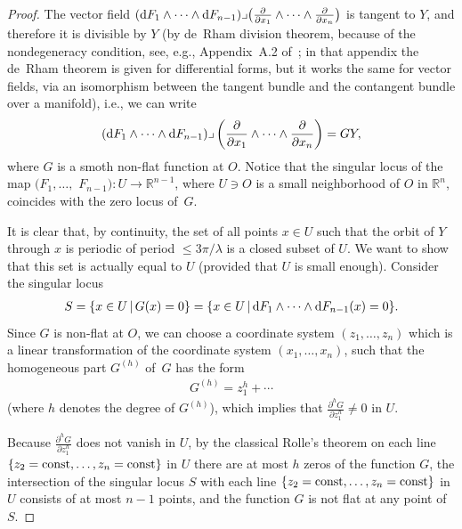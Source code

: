 \documentclass[11pt]{article}
\numberwithin{equation}{section}
\newcommand{\bbR}{\mathbb R}
\begin{document}
\begin{proof}
 The vector f\/ield $({\rm d}F_1 \wedge \dots \wedge {\rm d}F_{n-1})
\lrcorner \big(\frac{\partial}{\partial x_1} \wedge \dots \wedge \frac{\partial}{\partial x_n}\big)$
is tangent to $Y$, and therefore it is divisible by $Y$ (by de~Rham division theorem,
because of the nondegeneracy condition, see, e.g., Appendix~A.2 of~\cite{DufourZung-Poisson2005}; in that appendix the de~Rham theorem is given
for dif\/ferential forms, but it works the same for vector f\/ields, via an isomorphism between the tangent bundle and the contangent bundle over
a manifold), i.e., we can write
\begin{gather} \label{eqn:3-3}
 ({\rm d}F_1 \wedge \dots \wedge {\rm d}F_{n-1})
\lrcorner \left(\frac{\partial}{\partial x_1} \wedge \dots \wedge \frac{\partial}{\partial x_n}\right) = GY,
\end{gather}
where $G$ is a smoth non-f\/lat function at $O$. Notice that the singular locus of the map $(F_1,\dots,$ $F_{n-1})\colon U \to \bbR^{n-1}$,
where $U \ni O$ is a small neighborhood of $O$ in $\bbR^n$, coincides with the zero locus of~$G$.

It is clear that, by continuity, the set of all points $x \in U$ such that the orbit of $Y$ through $x$ is periodic of period $\leq 3\pi/\lambda$
is a closed subset of $U$. We want to show that this set is actually equal to $U$ (provided that $U$ is small enough).
Consider the singular locus
\begin{gather*}
 S = \{x \in U \, | \,G(x) = 0 \} = \{x \in U \, | \,{\rm d}F_1 \wedge \dots \wedge {\rm d}F_{n-1} (x) = 0 \}.
\end{gather*}
Since $G$ is non-f\/lat at $O$, we can choose a coordinate system $(z_1,\dots, z_n)$ which is a linear transformation of the
coordinate system $(x_1,\dots,x_n)$, such that the homogeneous part $G^{(h)}$ of~$G$ has the form
\begin{gather} \label{eqn:3-5}
 G^{(h)} = z_1^h + \cdots
\end{gather}
(where $h$ denotes the degree of $G^{(h)}$), which implies that $\frac{\partial^h G}{\partial z_1^h} \neq 0$ in $U$.

Because $\frac{\partial^h G}{\partial z_1^h}$ does not vanish in $U$, by the classical Rolle's theorem on each line $\{z_2={\rm const}, \dots, z_n = {\rm const}\}$ in $U$ there are at most $h$ zeros of the function $G$, the intersection of the singular locus $S$ with each line $\{z_2={\rm const}, \dots, z_n = {\rm const}\}$ in $U$ consists of at most $n-1$ points, and the function $G$ is not f\/lat at any point of $S$.


\end{proof}
\end{document}
